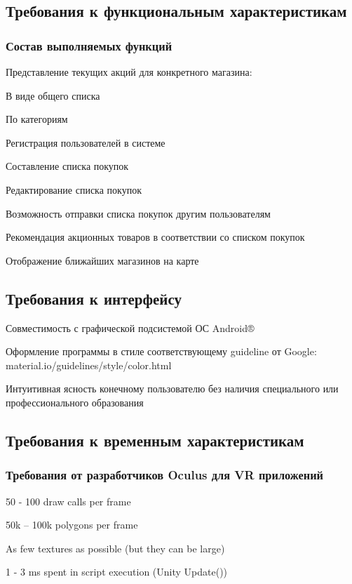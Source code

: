 \subsection{Требования к функциональным характеристикам}

\subsubsection{Состав выполняемых функций}
\begin{my_enumerate}
\item Представление текущих акций для конкретного магазина:
    \begin{my_enumerate}
    \item В виде общего списка
    \item По категориям
    \end{my_enumerate}
\item Регистрация пользователей в системе
\item Составление списка покупок
\item Редактирование списка покупок
\item Возможность отправки списка покупок другим пользователям
\item Рекомендация акционных товаров в соответствии со списком покупок
\item Отображение ближайших магазинов на карте
\end{my_enumerate}


\subsection{Требования к интерфейсу}

\begin{my_enumerate}
\item Совместимость с графической подсистемой ОС Android®
\item Оформление программы в стиле соответствующему guideline от Google:\\ material.io/guidelines/style/color.html
\item Интуитивная ясность конечному пользователю без наличия специального или профессионального образования
\end{my_enumerate}


\subsection{Требования к временным характеристикам}
\subsubsection{Требования от разработчиков Oculus для VR приложений}
\begin{my_enumerate}
\item 50 - 100 draw calls per frame
\item 50k – 100k polygons per frame
\item As few textures as possible (but they can be large)
\item 1 - 3 ms spent in script execution (Unity Update())
\end{my_enumerate}


